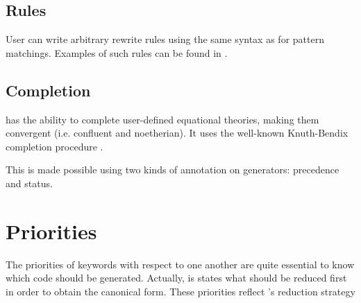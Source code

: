 \subsection{Rules}
\label{sec:rules}

User can write arbitrary rewrite rules using the same syntax as for
\ocaml pattern matchings. Examples of such rules can be found in
.

\subsection{Completion }
\label{sec:completion}

\moca has the ability to complete user-defined equational theories,
making them convergent (i.e. confluent and noetherian). 
It uses the well-known Knuth-Bendix completion
procedure \cite{DKnuPBen70}. 

This is made possible using two kinds of annotation on generators:
precedence and status.


\section{Priorities}
\label{sec:priorities}

The priorities of \moca keywords with respect to one another are quite
essential to know which code should be generated. Actually, is states
what should be reduced first in order to obtain the canonical
form. These priorities reflect \moca's reduction strategy


